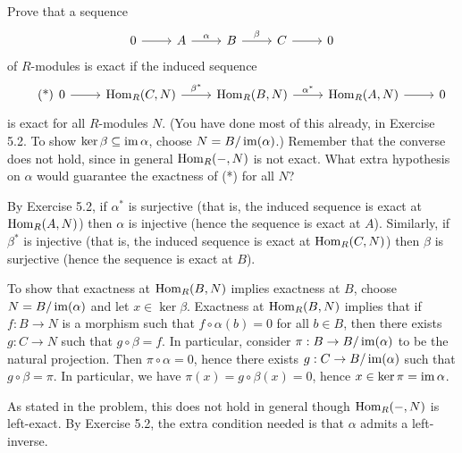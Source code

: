 \documentclass[../../master.tex]{subfiles}
\begin{document}
\begin{problem}
    Prove that a sequence
    \[
    \begin{tikzcd}
        0 & A & B & C & 0
        \arrow[from=1-1, to=1-2]
        \arrow[from=1-2, to=1-3, "\alpha"]
        \arrow[from=1-3, to=1-4, "\beta"]
        \arrow[from=1-4, to=1-5] 
    \end{tikzcd}
    \]
    of $R$-modules is exact if the induced sequence
    \[
        \tag{*}
        \begin{tikzcd}
            0 & \Hom_R(C, N) & \Hom_R(B, N) & \Hom_R(A, N) & 0
            \arrow[from=1-1, to=1-2]
            \arrow[from=1-2, to=1-3, "\beta^{*}"]
            \arrow[from=1-3, to=1-4, "\alpha^{*}"]
            \arrow[from=1-4, to=1-5] 
        \end{tikzcd}
    \]
    is exact for all $R$-modules $N$.
    (You have done most of this already, in Exercise 5.2.
    To show $\ker \beta \subseteq \operatorname{im} \alpha$, choose $N = B / \operatorname{im}(\alpha)$.)
    Remember that the converse does not hold, since in general $\operatorname{Hom}_R(-, N)$ is not exact.
    What extra hypothesis on $\alpha$ would guarantee the exactness of (*) for all $N$?
\end{problem}

\begin{solution}
    By Exercise 5.2, if $\alpha^{*}$ is surjective (that is, the induced sequence is exact at $\operatorname{Hom}_R(A, N)$) then $\alpha$ is injective (hence the sequence is exact at $A$).
    Similarly, if $\beta^{*}$ is injective (that is, the induced sequence is exact at $\operatorname{Hom}_R(C, N)$) then $\beta$ is surjective (hence the sequence is exact at $B$).

    To show that exactness at $\operatorname{Hom}_R(B, N)$ implies exactness at $B$, choose $N = B / \operatorname{im}(\alpha)$ and let $x \in \ker \beta$.
    Exactness at $\operatorname{Hom}_R(B, N)$ implies that if $f : B \to N$ is a morphism such that $f \circ \alpha(b) = 0$ for all $b \in B$, then there exists $g : C \to N$ such that $g \circ \beta = f$.
    In particular, consider $\pi : B \to B / \operatorname{im}(\alpha)$ to be the natural projection.
    Then $\pi \circ \alpha = 0$, hence there exists $g : C \to B / \operatorname{im}(\alpha)$ such that $g \circ \beta = \pi$.
    In particular, we have $\pi(x) = g \circ \beta(x) = 0$, hence $x \in \ker \pi = \operatorname{im} \alpha$.  

    As stated in the problem, this does not hold in general though $\operatorname{Hom}_R(-, N)$ is left-exact.
    By Exercise 5.2, the extra condition needed is that $\alpha$ admits a left-inverse.
\end{solution}
\end{document}
